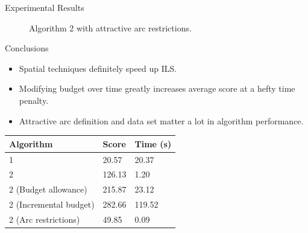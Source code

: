 \documentclass{beamer}
\begin{document}
\begin{frame}{Experimental Results}
\begin{center}
\begin{figure}
\caption{Algorithm 2 with attractive arc restrictions.}
\end{figure}
\end{center}
\end{frame}

\begin{frame}{Conclusions}
    \begin{itemize}
        \item Spatial techniques definitely speed up ILS.
        \item Modifying budget over time greatly increases average score at a hefty time penalty.
        \item Attractive arc definition and data set matter a lot in algorithm performance.
    \end{itemize}
    
    \begin{center}
    \begin{tabular}{|l|l|l|}
    \hline
    \textbf{Algorithm} & \textbf{Score} & \textbf{Time (s)} \\
    \hline
    1 & 20.57 & 20.37 \\
    \hline
    2 & 126.13 & 1.20 \\
    \hline
    2 (Budget allowance) & 215.87 & 23.12 \\
    \hline
    2 (Incremental budget) & 282.66 & 119.52 \\
    \hline
    2 (Arc restrictions) & 49.85 & 0.09 \\
    \hline
    \end{tabular}
    \end{center}
\end{frame}
\end{document}
